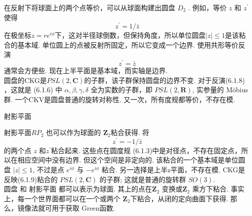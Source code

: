 在反射下将球面上的两个点等价，可以从球面构建出圆盘 $D_{2}$ . 例如，等价 $z$ 和 $z^{\prime}$ 使得
\begin{equation}
	z^{\prime}=1 / \bar{z}
\end{equation}
在极坐标$z=r e^{i \phi}$下，这对半径球倒数，但保持角度，所以单位圆盘$|z| \leq 1$是该粘合的基本域. 单位圆上的点被反射所固定，所以它变成一个边界. 使用共形等价反演
\begin{equation}
	z^{\prime}=\bar{z}
\end{equation}
通常会方便些. 现在上半平面是基本域，而实轴是边界.\\
圆盘的CKG是$P S L(2, \mathbf{C})$的子群，该子群保持圆盘的边界不变. 对于反演(6.1.8) ，这就是 (6.1.6) 中 $\alpha, \beta, \gamma, \delta$ 全为实数的子群，即 $P S L(2, \mathbf{R})$, 实参量的 Möbius 群. 一个CKV是圆盘普通的旋转对称性. 又一次，所有度规都等价，不存在模.\\

\centerline{\Large 射影平面}

射影平面$R P_{2}$ 也可以作为球面的 $\mathbf{Z}_{2}$粘合获得. 将
\begin{equation}
	z^{\prime}=-1 / \bar{z}
\end{equation}
的两个点 $z$ 和$z^{\prime}$粘合起来. 这些点在圆度规 (6.1.3)中是对径点，不存在固定点，所以在相应空间中没有边界. 但这个空间是非定向的. 该粘合的一个基本域是单位圆盘 $|z| \leq 1$, 不过是点 $e^{i \phi}$ 与 $-e^{i \phi}$ 粘合. 另一选择是上半z平面，不存在模. CKG是反映(6.1.9)粘合的 $P S L(2, \mathbf{C})$ 的子群; 这就是普通的旋转群 $S O(3)$.\\
圆盘 和 射影平面 都可以表示为球面. 其上的点在$\mathbf{Z}_{2}$ 变换或$\mathbf{Z}_{2}$ 乘方下粘合. 事实上，每一个世界面都可以在一个或两个 $\mathbf{Z}_{2} $下粘合，从闭的定向曲面下获得. 那么，镜像法就可用于获取 Green函数.

